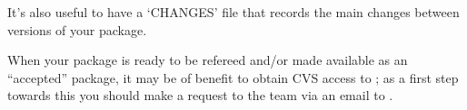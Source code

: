 It's also useful to have a `CHANGES' file that records the  main  changes
between versions of your package.


When your package is ready to be refereed and/or  made  available  as  an
``accepted'' {\GAP} package, it may be of benefit to obtain CVS access to
{\GAP}; as a first step towards this you should make  a  request  to  the
{\GAP} team via an email to .

